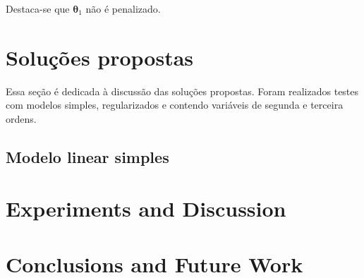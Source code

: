 \documentclass[10pt,twocolumn,letterpaper]{article}
\begin{document}
Destaca-se que \(\bm{\theta}_1\) não é penalizado.

\section{Soluções propostas}

Essa seção é dedicada à discussão das soluções propostas. Foram realizados testes com modelos simples, regularizados e contendo variáveis de segunda e terceira ordens.

\subsection {Modelo linear simples}

\section{Experiments and Discussion}

\section{Conclusions and Future Work}

{\small


}
\end{document}

